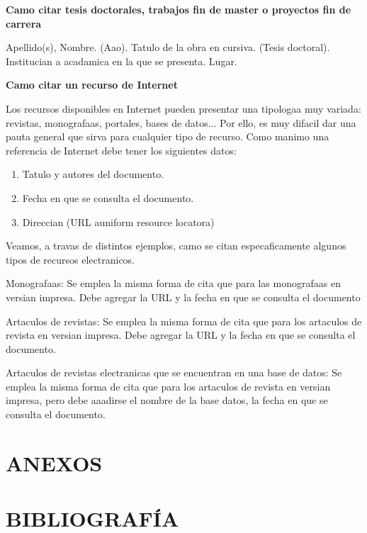 \documentclass[spanish,12pt, a4paper,twoside]{paper}
\let\oldsection\section
\def\section{\cleardoublepage\oldsection}
\begin{document}
\bigskip
{\bf Camo citar tesis doctorales, trabajos fin de master o proyectos fin de carrera}

Apellido(s), Nombre. (Aao). Tatulo de la obra en cursiva. (Tesis doctoral). Institucian a acadamica en la que se presenta. Lugar.

\bigskip
{\bf Camo citar un recurso de Internet}

Los recursos disponibles en Internet pueden presentar una tipologaa muy variada: revistas, monografaas, portales, bases de datos... Por ello, es muy difacil dar una pauta general que sirva para cualquier tipo de recurso.
Como manimo una referencia de Internet debe tener los siguientes datos:
\begin{enumerate}
\item Tatulo y autores del documento.
\item Fecha en que se consulta el documento.
\item Direccian (URL auniform resource locatora)
\end{enumerate}

Veamos, a travas de distintos ejemplos, camo se citan especaficamente algunos tipos de recursos electranicos.

Monografaas:
Se emplea la misma forma de cita que para las monografaas en versian impresa. Debe agregar la URL y la fecha en que se consulta el documento

Artaculos de revistas:
Se emplea la misma forma de cita que para los artaculos de revista en versian impresa. Debe agregar la URL y la fecha en que se consulta el documento.

Artaculos de revistas electranicas que se encuentran en una base de datos:
Se emplea la misma forma de cita que para los artaculos de revista en versian impresa, pero debe aaadirse el nombre de la base datos, la fecha en que se consulta el documento.

\section*{ANEXOS}


\section*{BIBLIOGRAFÍA}

\newpage
\end{document}

